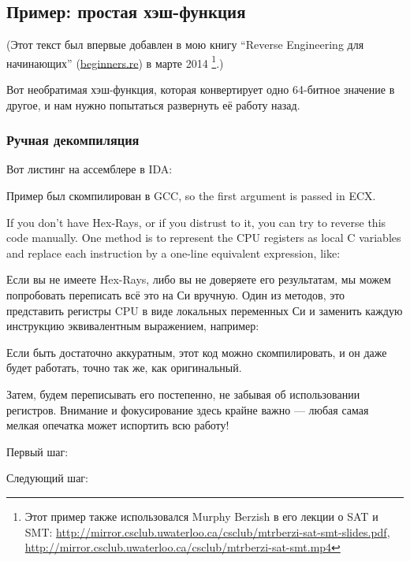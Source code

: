 \subsection{Пример: простая хэш-функция}

(Этот текст был впервые добавлен в мою книгу ``Reverse Engineering для начинающих'' (\url{beginners.re}) в марте 2014
\footnote{Этот пример также использовался Murphy Berzish в его лекции о \ac{SAT} и \ac{SMT}:
\url{http://mirror.csclub.uwaterloo.ca/csclub/mtrberzi-sat-smt-slides.pdf},
\url{http://mirror.csclub.uwaterloo.ca/csclub/mtrberzi-sat-smt.mp4}}.)

Вот необратимая хэш-функция, которая конвертирует одно 64-битное значение в другое,
и нам нужно попытаться развернуть её работу назад.

\subsubsection{Ручная декомпиляция}

Вот листинг на ассемблере в IDA:



Пример был скомпилирован в GCC, so the first argument is passed in ECX.

If you don't have Hex-Rays, or if you distrust to it, you can try to reverse this code manually.
One method is to represent the CPU registers as local C variables and replace each instruction by
a one-line equivalent expression, like:

Если вы не имеете Hex-Rays, либо вы не доверяете его результатам, мы можем попробовать
переписать всё это на Си вручную.
Один из методов, это представить регистры \ac{CPU} в виде локальных переменных Си и заменить каждую инструкцию
эквивалентным выражением, например:



Если быть достаточно аккуратным, этот код можно скомпилировать, и он даже будет работать, 
точно так же, как оригинальный.

Затем, будем переписывать его постепенно, не забывая об использовании регистров.
Внимание и фокусирование здесь крайне важно --- любая самая мелкая опечатка может испортить всю работу!

Первый шаг:



Следующий шаг:




